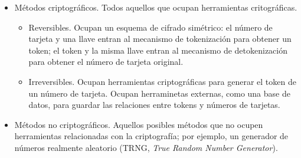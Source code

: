 \begin{itemize}
  \item Métodos criptográficos. Todos aquellos que ocupan herramientas
    critográficas.
    \begin{itemize}
      \item Reversibles. Ocupan un esquema de cifrado simétrico: el número
        de tarjeta y una llave entran al mecanismo de tokenización para obtener
        un token; el token y la misma llave entran al mecanismo de
        detokenización para obtener el número de tarjeta original.
      \item Irreversibles. Ocupan herramientas criptográficas para generar el
        token de un número de tarjeta. Ocupan herraminetas externas, como una
        base de datos, para guardar las relaciones entre tokens y números de
        tarjetas.
    \end{itemize}
  \item Métodos no criptográficos. Aquellos posibles métodos que no ocupen
    herramientas relacionadas con la criptografía; por ejemplo, un generador de
    números realmente aleatorio (TRNG, \textit{True Random Number Generator}).
\end{itemize}
